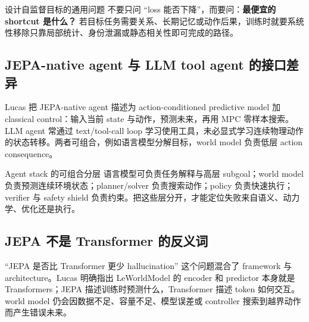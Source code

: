 
\begin{importantbox}{设计自监督目标的通用问题}
不要只问 ``loss 能否下降''，而要问：\textbf{最便宜的 shortcut 是什么？} 若目标任务需要关系、长期记忆或动作后果，训练时就要系统性移除只靠局部统计、身份泄漏或静态相关性即可完成的路径。
\end{importantbox}

\subsection{JEPA-native agent 与 LLM tool agent 的接口差异}

Lucas 把 JEPA-native agent 描述为 action-conditioned predictive model 加 classical control：输入当前 state 与动作，预测未来，再用 MPC 零样本搜索。LLM agent 常通过 text/tool-call loop 学习使用工具，未必显式学习连续物理动作的状态转移。两者可组合，例如语言模型分解目标，world model 负责低层 action consequence。


\begin{knowledgebox}{Agent stack 的可组合分层}
语言模型可负责任务解释与高层 subgoal；world model 负责预测连续环境状态；planner/solver 负责搜索动作；policy 负责快速执行；verifier 与 safety shield 负责约束。把这些层分开，才能定位失败来自语义、动力学、优化还是执行。
\end{knowledgebox}

\subsection{JEPA 不是 Transformer 的反义词}

``JEPA 是否比 Transformer 更少 hallucination'' 这个问题混合了 framework 与 architecture。Lucas 明确指出 LeWorldModel 的 encoder 和 predictor 本身就是 Transformers；JEPA 描述训练时预测什么，Transformer 描述 token 如何交互。world model 仍会因数据不足、容量不足、模型误差或 controller 搜索到越界动作而产生错误未来。



